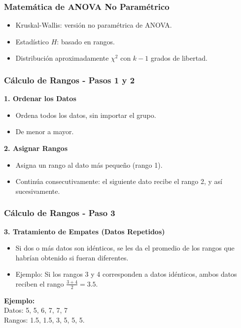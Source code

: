 \documentclass[aspectratio=169]{beamer}
\begin{document}
\begin{frame}
\frametitle{Matemática de ANOVA No Paramétrico}
\begin{itemize}
\item Kruskal-Wallis: versión no paramétrica de ANOVA.
\item Estadístico \( H \): basado en rangos.
\item Distribución aproximadamente \(\chi^2\) con \( k - 1 \) grados de libertad.
\end{itemize}
\end{frame}

\begin{frame}
\frametitle{Cálculo de Rangos - Pasos 1 y 2}
\textbf{1. Ordenar los Datos}
\begin{itemize}
\item Ordena todos los datos, sin importar el grupo.
\item De menor a mayor.
\end{itemize}

\textbf{2. Asignar Rangos}
\begin{itemize}
\item Asigna un rango al dato más pequeño (rango 1).


\item Continúa consecutivamente: el siguiente dato recibe el rango 2, y así sucesivamente.
\end{itemize}
\end{frame}

\begin{frame}
\frametitle{Cálculo de Rangos - Paso 3}
\textbf{3. Tratamiento de Empates (Datos Repetidos)}
\begin{itemize}
\item Si dos o más datos son idénticos, se les da el promedio de los rangos que habrían obtenido si fueran diferentes.
\item Ejemplo: Si los rangos 3 y 4 corresponden a datos idénticos, ambos datos reciben el rango \( \frac{3 + 4}{2} = 3.5 \).
\end{itemize}
\vfill

\textbf{Ejemplo:}\\ 
Datos: 5, 5, 6, 7, 7, 7\\
Rangos: 1.5, 1.5, 3, 5, 5, 5.
\end{frame}
\end{document}
